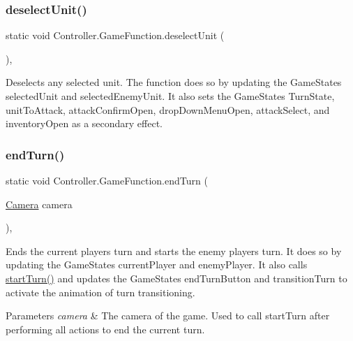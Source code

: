 \subsubsection{\texorpdfstring{deselect\+Unit()}{deselectUnit()}}
{\footnotesize\ttfamily static void Controller.\+Game\+Function.\+deselect\+Unit (\begin{DoxyParamCaption}{ }\end{DoxyParamCaption})\hspace{0.3cm}{\ttfamily [inline]}, {\ttfamily [static]}}

Deselects any selected unit. The function does so by updating the Game\+State\textquotesingle{}s selected\+Unit and selected\+Enemy\+Unit. It also sets the Game\+State\textquotesingle{}s Turn\+State, unit\+To\+Attack, attack\+Confirm\+Open, drop\+Down\+Menu\+Open, attack\+Select, and inventory\+Open as a secondary effect. ~\newline
~\newline
\hypertarget{class_controller_1_1_game_function_aae8d3490bc9fd6d22c3bf342fa80a7f1}{}\label{class_controller_1_1_game_function_aae8d3490bc9fd6d22c3bf342fa80a7f1} 
\subsubsection{\texorpdfstring{end\+Turn()}{endTurn()}}
{\footnotesize\ttfamily static void Controller.\+Game\+Function.\+end\+Turn (\begin{DoxyParamCaption}\item[{\hyperlink{class_view_1_1_camera}{Camera}}]{camera }\end{DoxyParamCaption})\hspace{0.3cm}{\ttfamily [inline]}, {\ttfamily [static]}}

Ends the current player\textquotesingle{}s turn and starts the enemy player\textquotesingle{}s turn. It does so by updating the Game\+State\textquotesingle{}s current\+Player and enemy\+Player. It also calls \hyperlink{class_controller_1_1_game_function_acb3bb5d76c1fb5a794e228da98c39009}{start\+Turn()} and updates the Game\+State\textquotesingle{}s end\+Turn\+Button and transition\+Turn to activate the animation of turn transitioning. 
\begin{DoxyParams}{Parameters}
{\em camera} & The camera of the game. Used to call start\+Turn after performing all actions to end the current turn. \\
\hline
\end{DoxyParams}
\hypertarget{class_controller_1_1_game_function_ad6e9b27c164633455ec7433d3b7b6f50}{}\label{class_controller_1_1_game_function_ad6e9b27c164633455ec7433d3b7b6f50} 
